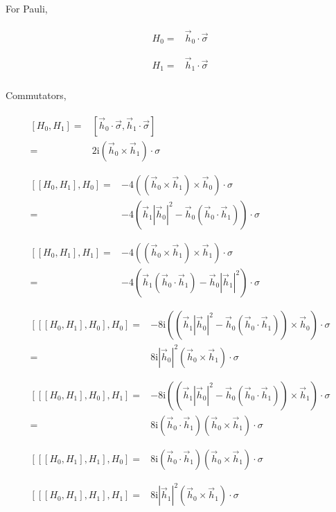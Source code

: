 \documentclass[10pt,fleqn]{article}
\newcommand{\ui}{\mathrm{i}}
\newcommand{\eqar}[1]
{
  \begin{align}
    #1
  \end{align}
}
\newcommand{\paren}[1]{{\left({#1}\right)}}
\newcommand{\abs}[1]{{\left|{#1}\right|}}
\newcommand{\sqr}[1]{{\left[{#1}\right]}}
\begin{document}
For Pauli,
\eqar{
  \begin{split}
    H_0=&\vec h_0\cdot\vec\sigma\\
  \end{split}\\
  \begin{split}
  H_1=&\vec h_1\cdot\vec\sigma\\
  \end{split}
}

Commutators,
\eqar{
  \begin{split}
    \sqr{H_0,H_1}=&\sqr{\vec h_0\cdot\vec\sigma,\vec h_1\cdot\vec\sigma}\\
    =&2\ui\paren{\vec h_0\times\vec h_1}\cdot\sigma\\
  \end{split}\\
  \begin{split}
    \sqr{\sqr{H_0,H_1},H_0}=&-4\paren{\paren{\vec h_0\times\vec h_1}\times\vec h_0}\cdot\sigma\\
    =&-4\paren{\vec h_1\abs{\vec h_0}^2-\vec h_0\paren{\vec h_0\cdot\vec h_1}}\cdot\sigma\\
  \end{split}\\
  \begin{split}
    \sqr{\sqr{H_0,H_1},H_1}=&-4\paren{\paren{\vec h_0\times\vec h_1}\times\vec h_1}\cdot\sigma\\
    =&-4\paren{\vec h_1\paren{\vec h_0\cdot\vec h_1}-\vec h_0\abs{\vec h_1}^2}\cdot\sigma\\
  \end{split}\\
  \begin{split}
    \sqr{\sqr{\sqr{H_0,H_1},H_0},H_0}=&-8\ui\paren{\paren{\vec h_1\abs{\vec h_0}^2-\vec h_0\paren{\vec h_0\cdot\vec h_1}}\times\vec h_0}\cdot\sigma\\
    =&8\ui\abs{\vec h_0}^2\paren{\vec h_0\times\vec h_1}\cdot\sigma\\
  \end{split}\\
  \begin{split}
    \sqr{\sqr{\sqr{H_0,H_1},H_0},H_1}=&-8\ui\paren{\paren{\vec h_1\abs{\vec h_0}^2-\vec h_0\paren{\vec h_0\cdot\vec h_1}}\times\vec h_1}\cdot\sigma\\
    =&8\ui\paren{\vec h_0\cdot\vec h_1}\paren{\vec h_0\times\vec h_1}\cdot\sigma\\
  \end{split}\\
  \begin{split}
    \sqr{\sqr{\sqr{H_0,H_1},H_1},H_0}=&8\ui\paren{\vec h_0\cdot\vec h_1}\paren{\vec h_0\times\vec h_1}\cdot\sigma\\
  \end{split}\\
  \begin{split}
    \sqr{\sqr{\sqr{H_0,H_1},H_1},H_1}=&8\ui\abs{\vec h_1}^2\paren{\vec h_0\times\vec h_1}\cdot\sigma\\
  \end{split}
}
\end{document}
